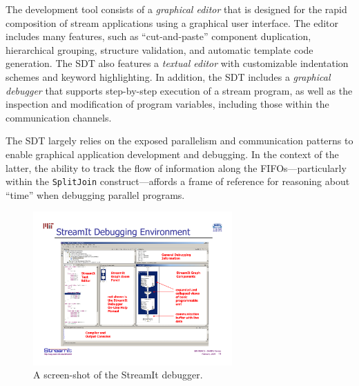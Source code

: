 \documentclass{csailabstractbook}
\begin{document}

The  development tool  consists of  a {\it  graphical editor}  that is
designed  for the  rapid composition  of stream  applications  using a
graphical user  interface. The editor includes many  features, such as
``cut-and-paste''   component   duplication,  hierarchical   grouping,
structure validation, and automatic  template code generation. The SDT
also  features a  {\it textual  editor} with  customizable indentation
schemes  and keyword highlighting.   In addition,  the SDT  includes a
{\it  graphical debugger}  that supports  step-by-step execution  of a
stream program, as well as  the inspection and modification of program
variables, including those within the communication channels.

The  SDT largely relies  on the  exposed parallelism  and communication
patterns to enable graphical application development and debugging. In
the  context  of  the  latter,  the  ability  to  track  the  flow  of
information along the  FIFOs---particularly within the {\tt SplitJoin}
construct---affords a frame of  reference for reasoning about ``time''
when debugging parallel programs.


\begin{figure}[tbh]
  \centerline{\includegraphics[width=3.0in, angle=270]{kuo_figure1.pdf}}
  \caption{A screen-shot of the StreamIt debugger.} 
  \label{kuo_figure1}
\end{figure}
\end{document}

